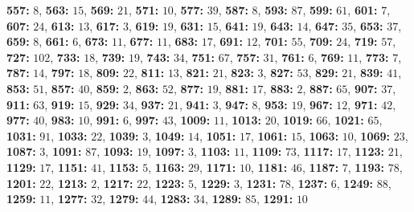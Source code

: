 \textsf{\bfseries 557:} $8$, \textsf{\bfseries 563:} $15$, \textsf{\bfseries 569:} $21$, \textsf{\bfseries 571:} $10$, \textsf{\bfseries 577:} $39$, \textsf{\bfseries 587:} $8$, \textsf{\bfseries 593:} $87$, \textsf{\bfseries 599:} $61$, \textsf{\bfseries 601:} $7$, \textsf{\bfseries 607:} $24$, \textsf{\bfseries 613:} $13$, \textsf{\bfseries 617:} $3$, \textsf{\bfseries 619:} $19$, \textsf{\bfseries 631:} $15$, \textsf{\bfseries 641:} $19$, \textsf{\bfseries 643:} $14$, \textsf{\bfseries 647:} $35$, \textsf{\bfseries 653:} $37$, \textsf{\bfseries 659:} $8$, \textsf{\bfseries 661:} $6$, \textsf{\bfseries 673:} $11$, \textsf{\bfseries 677:} $11$, \textsf{\bfseries 683:} $17$, \textsf{\bfseries 691:} $12$, \textsf{\bfseries 701:} $55$, \textsf{\bfseries 709:} $24$, \textsf{\bfseries 719:} $57$, \textsf{\bfseries 727:} $102$, \textsf{\bfseries 733:} $18$, \textsf{\bfseries 739:} $19$, \textsf{\bfseries 743:} $34$, \textsf{\bfseries 751:} $67$, \textsf{\bfseries 757:} $31$, \textsf{\bfseries 761:} $6$, \textsf{\bfseries 769:} $11$, \textsf{\bfseries 773:} $7$, \textsf{\bfseries 787:} $14$, \textsf{\bfseries 797:} $18$, \textsf{\bfseries 809:} $22$, \textsf{\bfseries 811:} $13$, \textsf{\bfseries 821:} $21$, \textsf{\bfseries 823:} $3$, \textsf{\bfseries 827:} $53$, \textsf{\bfseries 829:} $21$, \textsf{\bfseries 839:} $41$, \textsf{\bfseries 853:} $51$, \textsf{\bfseries 857:} $40$, \textsf{\bfseries 859:} $2$, \textsf{\bfseries 863:} $52$, \textsf{\bfseries 877:} $19$, \textsf{\bfseries 881:} $17$, \textsf{\bfseries 883:} $2$, \textsf{\bfseries 887:} $65$, \textsf{\bfseries 907:} $37$, \textsf{\bfseries 911:} $63$, \textsf{\bfseries 919:} $15$, \textsf{\bfseries 929:} $34$, \textsf{\bfseries 937:} $21$, \textsf{\bfseries 941:} $3$, \textsf{\bfseries 947:} $8$, \textsf{\bfseries 953:} $19$, \textsf{\bfseries 967:} $12$, \textsf{\bfseries 971:} $42$, \textsf{\bfseries 977:} $40$, \textsf{\bfseries 983:} $10$, \textsf{\bfseries 991:} $6$, \textsf{\bfseries 997:} $43$, \textsf{\bfseries 1009:} $11$, \textsf{\bfseries 1013:} $20$, \textsf{\bfseries 1019:} $66$, \textsf{\bfseries 1021:} $65$, \textsf{\bfseries 1031:} $91$, \textsf{\bfseries 1033:} $22$, \textsf{\bfseries 1039:} $3$, \textsf{\bfseries 1049:} $14$, \textsf{\bfseries 1051:} $17$, \textsf{\bfseries 1061:} $15$, \textsf{\bfseries 1063:} $10$, \textsf{\bfseries 1069:} $23$, \textsf{\bfseries 1087:} $3$, \textsf{\bfseries 1091:} $87$, \textsf{\bfseries 1093:} $19$, \textsf{\bfseries 1097:} $3$, \textsf{\bfseries 1103:} $11$, \textsf{\bfseries 1109:} $73$, \textsf{\bfseries 1117:} $17$, \textsf{\bfseries 1123:} $21$, \textsf{\bfseries 1129:} $17$, \textsf{\bfseries 1151:} $41$, \textsf{\bfseries 1153:} $5$, \textsf{\bfseries 1163:} $29$, \textsf{\bfseries 1171:} $10$, \textsf{\bfseries 1181:} $46$, \textsf{\bfseries 1187:} $7$, \textsf{\bfseries 1193:} $78$, \textsf{\bfseries 1201:} $22$, \textsf{\bfseries 1213:} $2$, \textsf{\bfseries 1217:} $22$, \textsf{\bfseries 1223:} $5$, \textsf{\bfseries 1229:} $3$, 
\textsf{\bfseries 1231:} $78$, \textsf{\bfseries 1237:} $6$, \textsf{\bfseries 1249:} $88$, \textsf{\bfseries 1259:} $11$, \textsf{\bfseries 1277:} $32$, \textsf{\bfseries 1279:} $44$, \textsf{\bfseries 1283:} $34$, \textsf{\bfseries 1289:} $85$, \textsf{\bfseries 1291:} $10$